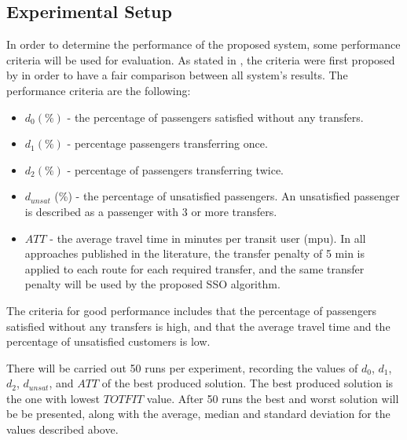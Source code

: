 \subsection{Experimental Setup}
\label{subsec:performanceComparison_setup}
In order to determine the performance of the proposed system, some performance criteria will be used for evaluation. As stated in \citet{kechagiopoulos14}, the criteria were first proposed by \citet{chakroborty02} in order to have a fair comparison between all system's results. The performance criteria are %
the following:
\begin{itemize}
\item $d_0 (\%)$ - the percentage of passengers satisfied without any transfers. 
\item $d_1 (\%)$ - percentage passengers transferring once. 
\item $d_2 (\%)$ - percentage of passengers transferring twice. 
\item $d_{unsat}$ (\%) - the percentage of unsatisfied passengers. An unsatisfied passenger is described as a passenger with 3 or more transfers. 
\item $ATT$  - the average travel time in minutes per transit user (mpu). In all approaches published in the literature, the transfer penalty of 5 min is applied to each route for each required transfer, and the same transfer penalty will be used by the proposed SSO algorithm.
\end{itemize}
The criteria for good performance includes that the percentage of passengers satisfied without any transfers is high, and that the average travel time and the percentage of unsatisfied customers is low. 



There will be carried out 50 runs per experiment, recording the values of $d_0$, $d_1$, $d_2$, $d_{unsat}$, and $ATT$ of the best produced solution. The best produced solution is the one with lowest $TOTFIT$ value. After 50 runs the best and worst solution will be be presented, along with the average, median and standard deviation for the values described above. %


